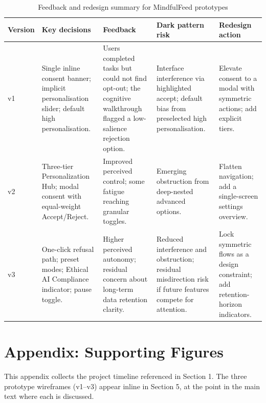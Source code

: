 \documentclass[11pt]{article}
\begin{document}
\begin{table}[H]
\centering
\caption{Feedback and redesign summary for MindfulFeed prototypes}
\label{tab:feedback_redesign_summary}
\small
\begin{tabular}{p{1.3cm}p{2.8cm}p{2.8cm}p{2.8cm}p{2.8cm}}
\hline
\textbf{Version} & \textbf{Key decisions} & \textbf{Feedback} & \textbf{Dark pattern risk} & \textbf{Redesign action} \\
\hline
v1 & Single inline consent banner; implicit personalisation slider; default high personalisation. & Users completed tasks but could not find opt-out; the cognitive walkthrough flagged a low-salience rejection option. & Interface interference via highlighted accept; default bias from preselected high personalisation. & Elevate consent to a modal with symmetric actions; add explicit tiers. \\
v2 & Three-tier Personalization Hub; modal consent with equal-weight Accept/Reject. & Improved perceived control; some fatigue reaching granular toggles. & Emerging obstruction from deep-nested advanced options. & Flatten navigation; add a single-screen settings overview. \\
v3 & One-click refusal path; preset modes; Ethical AI Compliance indicator; pause toggle. & Higher perceived autonomy; residual concern about long-term data retention clarity. & Reduced interference and obstruction; residual misdirection risk if future features compete for attention. & Lock symmetric flows as a design constraint; add retention-horizon indicators. \\
\hline
\end{tabular}
\end{table}


\clearpage
\section{Appendix: Supporting Figures}
\label{sec:appendix_figures}
This appendix collects the project timeline referenced in Section 1. The three prototype wireframes (v1--v3) appear inline in Section 5, at the point in the main text where each is discussed.
\end{document}
